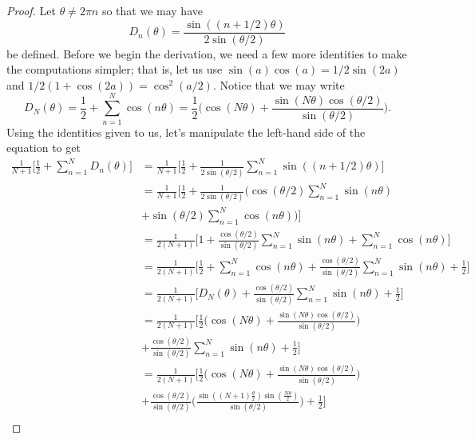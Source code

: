 \begin{proof}
Let \( \theta \neq 2 \pi n  \) so that we may have
\[  D_{n}(\theta) = \frac{ \sin((n+1/2)\theta)  }{ 2 \sin(\theta/2) }    \] be defined. Before we begin the derivation, we need a few more identities to make the computations simpler; that is, let us use \(  \sin(a)\cos(a) = 1/2 \sin(2a)   \) and \(  1/2(1 + \cos(2a)) = \cos^{2}(a/2)  \). Notice that we may write 
\[  D_{N}(\theta) = \frac{ 1 }{ 2 } + \sum_{ n=1 }^{ N  } \cos( n\theta ) = \frac{ 1 }{ 2 }  \Big(  \cos(N \theta) + \frac{ \sin(N \theta) \cos( \theta/2) }{ \sin(\theta/2)   } \Big) . \] 
Using the identities given to us, let's manipulate the left-hand side of the equation to get
\begin{align*}
    \frac{ 1 }{ N+1 } \Big[\frac{ 1 }{ 2 } + \sum_{ n=1 }^{ N } D_{n}(\theta)\Big] 
    &= \frac{ 1 }{ N+1 } \Big[ \frac{ 1 }{ 2 }  + \frac{ 1 }{ 2 \sin(\theta/2) } \sum_{ n=1 }^{ N } \sin((n+1/2) \theta) \Big] \\
    &= \frac{ 1 }{ N+1 } \Big[ \frac{ 1 }{ 2 }  + \frac{ 1 }{ 2 \sin(\theta/2) } \Big( \cos(\theta/2) \sum_{ n=1 }^{ N } \sin(n \theta)  \\ &+ \sin(\theta/2) \sum_{ n=1 }^{ N } \cos(n \theta)  \Big) \Big] \\
    &= \frac{ 1 }{ 2(N+1)  } \Big[1 + \frac{ \cos(\theta/2) }{ \sin(\theta/2) } \sum_{ n=1 }^{ N } \sin(n \theta) + \sum_{ n=1 }^{ N  } \cos(n \theta) \Big] \\
    &= \frac{ 1 }{ 2(N+1)  } \Big[ \frac{ 1 }{ 2 }  + \sum_{ n=1 }^{ N } \cos(n \theta) + \frac{ \cos(\theta/2) }{ \sin(\theta/2)   } \sum_{ n=1 }^{ N } \sin( n \theta) + \frac{ 1 }{ 2 }  \Big] \\
    &= \frac{ 1 }{ 2(N+1)  } \Big[ D_{N}(\theta) + \frac{ \cos(\theta/2)  }{ \sin(\theta/2) } \sum_{ n=1 }^{ N  } \sin(n\theta) + \frac{ 1 }{ 2 } \Big] \\
    &= \frac{ 1 }{ 2(N+1) }  \Big[ \frac{ 1 }{ 2 }  \Big( \cos(N \theta) + \frac{ \sin(N \theta) \cos(\theta/2) }{ \sin(\theta/2) }  \Big)  \\ 
    &+ \frac{ \cos(\theta/2) }{ \sin(\theta/2) } \sum_{ n=1 }^{ N } \sin(n \theta) + \frac{ 1 }{ 2 }   \Big] \\
    &= \frac{ 1 }{ 2 (N+1)  } \Big[ \frac{ 1 }{ 2 }  \Big(  \cos(N\theta) + \frac{ \sin(N\theta) \cos(\theta/2) }{ \sin(\theta/2) }  \Big) \\ &+ \frac{ \cos(\theta/2) }{ \sin(\theta/2) } \Big( \frac{ \sin((N+1) \frac{ \theta }{ 2 } ) \sin(\frac{ N \theta }{ 2 } ) }{ \sin(\theta/2) }  \Big) + \frac{ 1 }{ 2 }   \Big] \\

\end{align*}
\end{proof}
